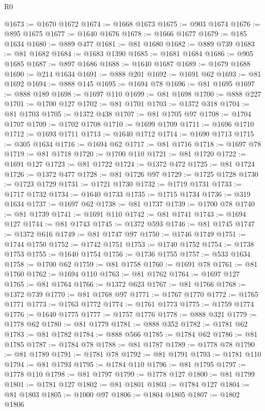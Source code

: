 \begin{lexlean}{R0}
\begin{coremodule}
@1673 := @1670 @1672
@1674 := @1668 @1673
@1675 := @903 @1674
@1676 := @895 @1675
@1677 := @1640 @1676
@1678 := @1666 @1677
@1679 := @185 @1634
@1680 := @889 @477
@1681 := @81 @1680
@1682 := @889 @739
@1683 := @81 @1682
@1684 := @1683 @1390
@1685 := @1681 @1684
@1686 := @905 @1685
@1687 := @897 @1686
@1688 := @1640 @1687
@1689 := @1679 @1688
@1690 := @214 @1634
@1691 := @888 @201
@1692 := @1691 @62
@1693 := @81 @1692
@1694 := @888 @145
@1695 := @1694 @78
@1696 := @81 @1695
@1697 := @888 @189
@1698 := @1697 @110
@1699 := @81 @1698
@1700 := @888 @227
@1701 := @1700 @127
@1702 := @81 @1701
@1703 := @1372 @318
@1704 := @81 @1703
@1705 := @1372 @438
@1707 := @81 @1705 @97
@1708 := @1704 @1707
@1709 := @1702 @1708
@1710 := @1699 @1709
@1711 := @1696 @1710
@1712 := @1693 @1711
@1713 := @1640 @1712
@1714 := @1690 @1713
@1715 := @305 @1634
@1716 := @1694 @62
@1717 := @81 @1716
@1718 := @1697 @78
@1719 := @81 @1718
@1720 := @1700 @110
@1721 := @81 @1720
@1722 := @1691 @127
@1723 := @81 @1722
@1724 := @1372 @472
@1725 := @81 @1724
@1726 := @1372 @477
@1728 := @81 @1726 @97
@1729 := @1725 @1728
@1730 := @1723 @1729
@1731 := @1721 @1730
@1732 := @1719 @1731
@1733 := @1717 @1732
@1734 := @1640 @1733
@1735 := @1715 @1734
@1736 := @319 @1634
@1737 := @1697 @62
@1738 := @81 @1737
@1739 := @1700 @78
@1740 := @81 @1739
@1741 := @1691 @110
@1742 := @81 @1741
@1743 := @1694 @127
@1744 := @81 @1743
@1745 := @1372 @593
@1746 := @81 @1745
@1747 := @1372 @616
@1749 := @81 @1747 @97
@1750 := @1746 @1749
@1751 := @1744 @1750
@1752 := @1742 @1751
@1753 := @1740 @1752
@1754 := @1738 @1753
@1755 := @1640 @1754
@1756 := @1736 @1755
@1757 := @533 @1634
@1758 := @1700 @62
@1759 := @81 @1758
@1760 := @1691 @78
@1761 := @81 @1760
@1762 := @1694 @110
@1763 := @81 @1762
@1764 := @1697 @127
@1765 := @81 @1764
@1766 := @1372 @623
@1767 := @81 @1766
@1768 := @1372 @739
@1770 := @81 @1768 @97
@1771 := @1767 @1770
@1772 := @1765 @1771
@1773 := @1763 @1772
@1774 := @1761 @1773
@1775 := @1759 @1774
@1776 := @1640 @1775
@1777 := @1757 @1776
@1778 := @888 @321
@1779 := @1778 @62
@1780 := @81 @1779
@1781 := @888 @352
@1782 := @1781 @62
@1783 := @81 @1782
@1784 := @888 @566
@1785 := @1784 @62
@1786 := @81 @1785
@1787 := @1784 @78
@1788 := @81 @1787
@1789 := @1778 @78
@1790 := @81 @1789
@1791 := @1781 @78
@1792 := @81 @1791
@1793 := @1781 @110
@1794 := @81 @1793
@1795 := @1784 @110
@1796 := @81 @1795
@1797 := @1778 @110
@1798 := @81 @1797
@1799 := @1778 @127
@1800 := @81 @1799
@1801 := @1781 @127
@1802 := @81 @1801
@1803 := @1784 @127
@1804 := @81 @1803
@1805 := @1000 @97
@1806 := @1804 @1805
@1807 := @1802 @1806

\end{coremodule}
\end{lexlean}
